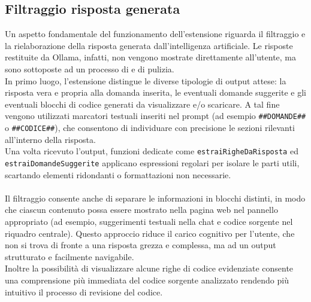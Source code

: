 \subsection{Filtraggio risposta generata}
\noindent Un aspetto fondamentale del funzionamento dell'estensione riguarda il filtraggio e la rielaborazione della risposta generata dall’intelligenza artificiale. Le risposte restituite da Ollama, infatti, non vengono mostrate direttamente all’utente, ma sono sottoposte ad un processo di  e di pulizia.\\
In primo luogo, l’estensione distingue le diverse tipologie di output attese: la risposta vera e propria alla domanda inserita, le eventuali domande suggerite e gli eventuali blocchi di codice generati da visualizzare e/o scaricare. A tal fine vengono utilizzati marcatori testuali inseriti nel prompt (ad esempio \texttt{\#\#DOMANDE\#\#} o \texttt{\#\#CODICE\#\#}), che consentono di individuare con precisione le sezioni rilevanti all’interno della risposta. \\Una volta ricevuto l’output, funzioni dedicate come \texttt{estraiRigheDaRisposta} ed \\ \texttt{estraiDomandeSuggerite} applicano espressioni regolari per isolare le parti utili, scartando elementi ridondanti o formattazioni non necessarie.\\
\\
Il filtraggio consente anche di separare le informazioni in blocchi distinti, in modo che ciascun contenuto possa essere mostrato nella pagina web nel pannello appropriato (ad esempio, suggerimenti testuali nella chat e codice sorgente nel riquadro centrale). Questo approccio riduce il carico cognitivo per l’utente, che non si trova di fronte a una risposta grezza e complessa, ma ad un output strutturato e facilmente navigabile.\\ Inoltre la possibilità di visualizzare alcune righe di codice evidenziate consente una comprensione più immediata del codice sorgente analizzato rendendo più intuitivo il processo di revisione del codice.

